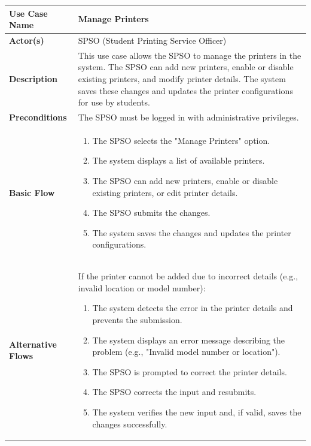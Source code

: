 \begin{enumerate}
        \begin{table}[h!]
            \centering
            \renewcommand{\arraystretch}{1.8}
            \begin{tabular}{|>{\centering\arraybackslash}m{3cm}|>{\raggedright\arraybackslash}m{10cm}|}
            \hline
            \textbf{Use Case Name} & Manage Printers \\ \hline
            \textbf{Actor(s)} & SPSO (Student Printing Service Officer) \\ \hline
            \textbf{Description} & This use case allows the SPSO to manage the printers in the system. The SPSO can add new printers, enable or disable existing printers, and modify printer details. The system saves these changes and updates the printer configurations for use by students. \\ \hline
            \textbf{Preconditions} & The SPSO must be logged in with administrative privileges. \\ \hline
            \textbf{Basic Flow} & 
            \begin{enumerate}
                \item The SPSO selects the "Manage Printers" option.
                \item The system displays a list of available printers.
                \item The SPSO can add new printers, enable or disable existing printers, or edit printer details.
                \item The SPSO submits the changes.
                \item The system saves the changes and updates the printer configurations.
            \end{enumerate} \\ \hline
            \textbf{Alternative Flows} & 
            If the printer cannot be added due to incorrect details (e.g., invalid location or model number):
            \begin{enumerate}
                \item The system detects the error in the printer details and prevents the submission.
                \item The system displays an error message describing the problem (e.g., "Invalid model number or location").
                \item The SPSO is prompted to correct the printer details.
                \item The SPSO corrects the input and resubmits.
                \item The system verifies the new input and, if valid, saves the changes successfully.

\end{enumerate}
\end{tabular}
\end{table}
\end{enumerate}
